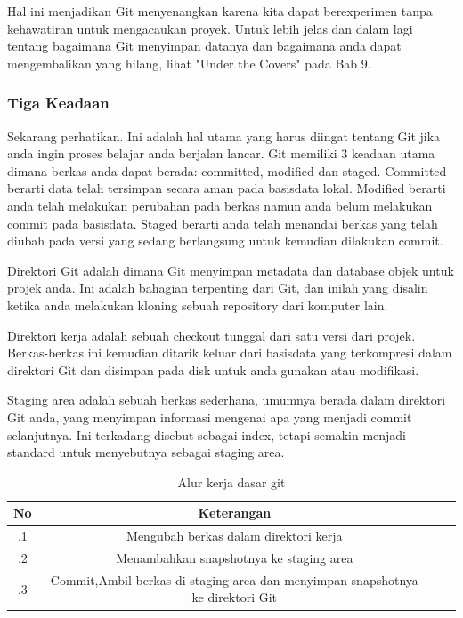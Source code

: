 Hal ini menjadikan Git menyenangkan karena kita dapat berexperimen tanpa 
kehawatiran untuk mengacaukan proyek. Untuk lebih jelas dan dalam lagi 
tentang bagaimana Git menyimpan datanya dan bagaimana anda dapat 
mengembalikan yang hilang, lihat "Under the Covers" pada Bab 9.\vspace{12pt}

\subsubsection{Tiga Keadaan}\vspace{12pt}
Sekarang perhatikan. Ini adalah hal utama yang harus diingat tentang Git 
jika anda ingin proses belajar anda berjalan lancar. Git memiliki 3 
keadaan utama dimana berkas anda dapat berada: committed, modified dan 
staged. Committed berarti data telah tersimpan secara aman pada 
basisdata lokal. Modified berarti anda telah melakukan perubahan pada 
berkas namun anda belum melakukan commit pada basisdata. Staged berarti 
anda telah menandai berkas yang telah diubah pada versi yang sedang 
berlangsung untuk kemudian dilakukan commit.\vspace{12pt}

Direktori Git adalah dimana Git menyimpan metadata dan database objek 
untuk projek anda. Ini adalah bahagian terpenting dari Git, dan inilah 
yang disalin ketika anda melakukan kloning sebuah repository dari 
komputer lain.\vspace{12pt}

Direktori kerja adalah sebuah checkout tunggal dari satu versi dari 
projek. Berkas-berkas ini kemudian ditarik keluar dari basisdata yang 
terkompresi dalam direktori Git dan disimpan pada disk untuk anda 
gunakan atau modifikasi.\vspace{12pt}

Staging area adalah sebuah berkas sederhana, umumnya berada dalam 
direktori Git anda, yang menyimpan informasi mengenai apa yang menjadi 
commit selanjutnya. Ini terkadang disebut sebagai index, tetapi semakin 
menjadi standard untuk menyebutnya sebagai staging area.\vspace{12pt}

\begin{table}[ht]
	\caption{Alur kerja dasar git}
	\centering
	\begin{tabular}{cccc}
		\hline
		No&Keterangan&\\
		\hline
		.1&Mengubah berkas dalam direktori kerja&\\
		.2&Menambahkan snapshotnya ke staging 
		area&\\
		.3&Commit,Ambil berkas di 
		staging area dan menyimpan snapshotnya ke direktori Git&\\
		\hline
	\end{tabular}
\end{table}

